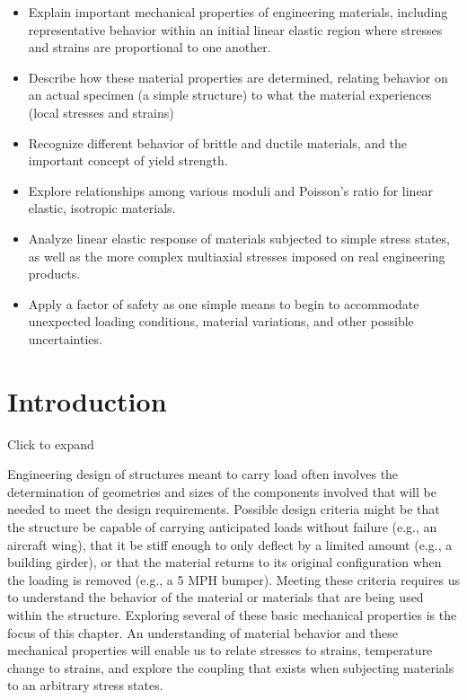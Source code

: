 \documentclass[
  letterpaper,
  DIV=11,
  numbers=noendperiod]{scrreprt}
\providecommand{\tightlist}{%
  \setlength{\itemsep}{0pt}\setlength{\parskip}{0pt}}\usepackage{longtable,booktabs,array}
\theoremstyle{definition}
\theoremstyle{remark}
\begin{document}
\begin{tcolorbox}[enhanced jigsaw, leftrule=.75mm, bottomrule=.15mm, opacityback=0, opacitybacktitle=0.6, colframe=quarto-callout-note-color-frame, toprule=.15mm, colbacktitle=quarto-callout-note-color!10!white, coltitle=black, bottomtitle=1mm, title={Learning Objectives}, titlerule=0mm, toptitle=1mm, colback=white, rightrule=.15mm, left=2mm, arc=.35mm, breakable]

\begin{itemize}
\tightlist
\item
  Explain important mechanical properties of engineering materials,
  including representative behavior within an initial linear elastic
  region where stresses and strains are proportional to one another.
\item
  Describe how these material properties are determined, relating
  behavior on an actual specimen (a simple structure) to what the
  material experiences (local stresses and strains)
\item
  Recognize different behavior of brittle and ductile materials, and the
  important concept of yield strength.
\item
  Explore relationships among various moduli and Poisson's ratio for
  linear elastic, isotropic materials.
\item
  Analyze linear elastic response of materials subjected to simple
  stress states, as well as the more complex multiaxial stresses imposed
  on real engineering products.
\item
  Apply a factor of safety as one simple means to begin to accommodate
  unexpected loading conditions, material variations, and other possible
  uncertainties.
\end{itemize}

\end{tcolorbox}

\section*{Introduction}\label{introduction-3}


Click to expand

Engineering design of structures meant to carry load often involves the
determination of geometries and sizes of the components involved that
will be needed to meet the design requirements. Possible design criteria
might be that the structure be capable of carrying anticipated loads
without failure (e.g., an aircraft wing), that it be stiff enough to
only deflect by a limited amount (e.g., a building girder), or that the
material returns to its original configuration when the loading is
removed (e.g., a 5 MPH bumper). Meeting these criteria requires us to
understand the behavior of the material or materials that are being used
within the structure. Exploring several of these basic mechanical
properties is the focus of this chapter. An understanding of material
behavior and these mechanical properties will enable us to relate
stresses to strains, temperature change to strains, and explore the
coupling that exists when subjecting materials to an arbitrary stress
states.
\end{document}
